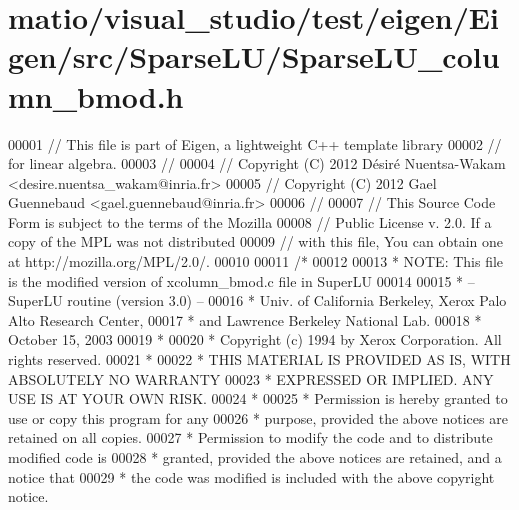 \hypertarget{matio_2visual__studio_2test_2eigen_2_eigen_2src_2_sparse_l_u_2_sparse_l_u__column__bmod_8h_source}{}\section{matio/visual\+\_\+studio/test/eigen/\+Eigen/src/\+Sparse\+L\+U/\+Sparse\+L\+U\+\_\+column\+\_\+bmod.h}
\label{matio_2visual__studio_2test_2eigen_2_eigen_2src_2_sparse_l_u_2_sparse_l_u__column__bmod_8h_source}

\begin{DoxyCode}
00001 \textcolor{comment}{// This file is part of Eigen, a lightweight C++ template library}
00002 \textcolor{comment}{// for linear algebra.}
00003 \textcolor{comment}{//}
00004 \textcolor{comment}{// Copyright (C) 2012 Désiré Nuentsa-Wakam <desire.nuentsa\_wakam@inria.fr>}
00005 \textcolor{comment}{// Copyright (C) 2012 Gael Guennebaud <gael.guennebaud@inria.fr>}
00006 \textcolor{comment}{//}
00007 \textcolor{comment}{// This Source Code Form is subject to the terms of the Mozilla}
00008 \textcolor{comment}{// Public License v. 2.0. If a copy of the MPL was not distributed}
00009 \textcolor{comment}{// with this file, You can obtain one at http://mozilla.org/MPL/2.0/.}
00010 
00011 \textcolor{comment}{/* }
00012 \textcolor{comment}{ }
00013 \textcolor{comment}{ * NOTE: This file is the modified version of xcolumn\_bmod.c file in SuperLU }
00014 \textcolor{comment}{ }
00015 \textcolor{comment}{ * -- SuperLU routine (version 3.0) --}
00016 \textcolor{comment}{ * Univ. of California Berkeley, Xerox Palo Alto Research Center,}
00017 \textcolor{comment}{ * and Lawrence Berkeley National Lab.}
00018 \textcolor{comment}{ * October 15, 2003}
00019 \textcolor{comment}{ *}
00020 \textcolor{comment}{ * Copyright (c) 1994 by Xerox Corporation.  All rights reserved.}
00021 \textcolor{comment}{ *}
00022 \textcolor{comment}{ * THIS MATERIAL IS PROVIDED AS IS, WITH ABSOLUTELY NO WARRANTY}
00023 \textcolor{comment}{ * EXPRESSED OR IMPLIED.  ANY USE IS AT YOUR OWN RISK.}
00024 \textcolor{comment}{ *}
00025 \textcolor{comment}{ * Permission is hereby granted to use or copy this program for any}
00026 \textcolor{comment}{ * purpose, provided the above notices are retained on all copies.}
00027 \textcolor{comment}{ * Permission to modify the code and to distribute modified code is}
00028 \textcolor{comment}{ * granted, provided the above notices are retained, and a notice that}
00029 \textcolor{comment}{ * the code was modified is included with the above copyright notice.}

\end{DoxyCode}
